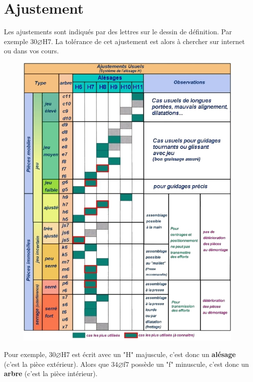 \documentclass[
	11pt, %
	fleqn, %
	a4paper, %
]{LegrandOrangeBook}
\begin{document}
\section{Ajustement}
Les ajustements sont indiqués par des lettres sur le dessin de définition. Par exemple $30\varnothing$H7. La tolérance de cet ajustement est alors à chercher sur internet ou dans vos cours.
 \begin{figure}[H] %
	\centering %
	\includegraphics[width=1\textwidth]{Images/AA11.jpg} %

	\label{fig:placeholder} %
\end{figure}
Pour exemple, $30\varnothing$H7 est écrit avec un "H" majuscule, c'est donc un \textbf{alésage} (c'est la pièce extérieur). Alors que $34\varnothing$f7 possède un "f" minuscule, c'est donc un \textbf{arbre} (c'est la pièce intérieur).
\end{document}
